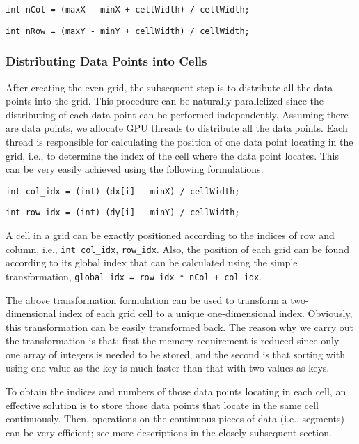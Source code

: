 \documentclass[final,5p,times,twocolumn,authoryear]{elsarticle}
\begin{document}
			\texttt{int nCol = (maxX - minX + cellWidth) / cellWidth;}
			
			\texttt{int nRow = (maxY - minY + cellWidth) / cellWidth;}
			
			\subsubsection{Distributing Data Points into Cells}
			
			After creating the even grid, the subsequent step is to distribute all the 
			data points into the grid. This procedure can be naturally parallelized 
			since the distributing of each data point can be performed independently. 
			Assuming there are  data points, we allocate  GPU threads to distribute all 
			the data points. Each thread is responsible for calculating the position of 
			one data point locating in the grid, i.e., to determine the index of the 
			cell where the data point locates. This can be very easily achieved using 
			the following formulations.
			
			\texttt{int col{\_}idx = (int) (dx[i] - minX) / cellWidth;}
			
			\texttt{int row{\_}idx = (int) (dy[i] - minY) / cellWidth;}
			
			A cell in a grid can be exactly positioned according to the indices of row 
			and column, i.e., \texttt{int col{\_}idx}, \texttt{row{\_}idx}. Also, the position of each 
			grid can be found according to its global index that can be calculated using 
			the simple transformation, \texttt{global{\_}idx = row{\_}idx * nCol + col{\_}idx}. 
			
			The above transformation formulation can be used to transform a 
			two-dimensional index of each grid cell to a unique one-dimensional index. 
			Obviously, this transformation can be easily transformed back. The reason 
			why we carry out the transformation is that: first the memory requirement is 
			reduced since only one array of integers is needed to be stored, and the 
			second is that sorting with using one value as the key is much faster than 
			that with two values as keys. 
			
			To obtain the indices and numbers of those data points locating in each 
			cell, an effective solution is to store those data points that locate in the 
			same cell continuously. Then, operations on the continuous pieces of data 
			(i.e., segments) can be very efficient; see more descriptions in the closely 
			subsequent section.
			
\end{document}
